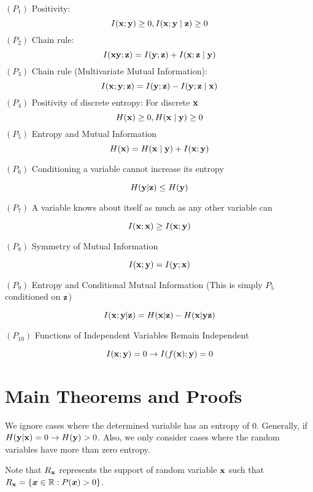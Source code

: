 \documentclass[letterpaper]{article} %
\theoremstyle{plain}
\theoremstyle{definition}
\theoremstyle{remark}
\begin{document}
$\left(P_1\right)$ Positivity:
$$
I({\mathbf{x}} ; {\mathbf{y}}) \geq 0, I({\mathbf{x}} ; {\mathbf{y}} \mid {\mathbf{z}}) \geq 0
$$
$\left(P_2\right)$ Chain rule:
$$
I({\mathbf{x}} {\mathbf{y}} ; {\mathbf{z}})=I({\mathbf{y}} ; {\mathbf{z}})+I({\mathbf{x}} ; {\mathbf{z}} \mid {\mathbf{y}})
$$
$\left(P_3\right)$ Chain rule (Multivariate Mutual Information):
$$
I({\mathbf{x}} ; {\mathbf{y}} ; {\mathbf{z}})=I({\mathbf{y}} ; {\mathbf{z}})-I({\mathbf{y}} ; {\mathbf{z}} \mid {\mathbf{x}})
$$
$\left(P_4\right)$ Positivity of discrete entropy:
For discrete ${\mathbf{x}}$
$$
H({\mathbf{x}}) \geq 0, H({\mathbf{x}} \mid {\mathbf{y}}) \geq 0
$$
$\left(P_5\right)$ Entropy and Mutual Information
$$
H({\mathbf{x}})=H({\mathbf{x}} \mid {\mathbf{y}})+I({\mathbf{x}} ; {\mathbf{y}})
$$

$(P_6)$ Conditioning a variable cannot increase its entropy

$$
H({\mathbf{y}}|{\mathbf{z}}) \leq H({\mathbf{y}})
$$

$(P_7)$ A variable knows about itself as much as any other variable can 

$$
I({\mathbf{x}};{\mathbf{x}}) \geq I({\mathbf{x}};{\mathbf{y}}) 
$$

$(P_8)$ Symmetry of Mutual Information

$$
I({\mathbf{x}};{\mathbf{y}}) = I({\mathbf{y}};{\mathbf{x}}) 
$$

$(P_9)$ Entropy and Conditional Mutual Information (This is simply $P_5$ conditioned on ${\mathbf{z}}$)

$$
I({\mathbf{x}};{\mathbf{y}}|{\mathbf{z}})  = H({\mathbf{x}}|{\mathbf{z}}) - H({\mathbf{x}}|{\mathbf{y}}{\mathbf{z}})
$$

$(P_{10})$ Functions of Independent Variables Remain Independent

$$
I({\mathbf{x}}; {\mathbf{y}}) = 0 \rightarrow I(f({\mathbf{x}});{\mathbf{y}}) = 0
$$


\section{Main Theorems and Proofs}


\label{mainproofs}

We ignore cases where the determined variable has an entropy of 0. Generally, if $H({\mathbf{y}}| {\mathbf{x}}) = 0 \rightarrow H({\mathbf{y}}) > 0$. Also, we only consider cases where the random variables have more than zero entropy.

Note that $R_{{\mathbf{x}}}$ represents the support of random variable ${\mathbf{x}}$ such that $R_{{\mathbf{x}}} = \{{\bm{x}} \in \mathbb{R} : P({\bm{x}}) > 0\}$.
\end{document}
